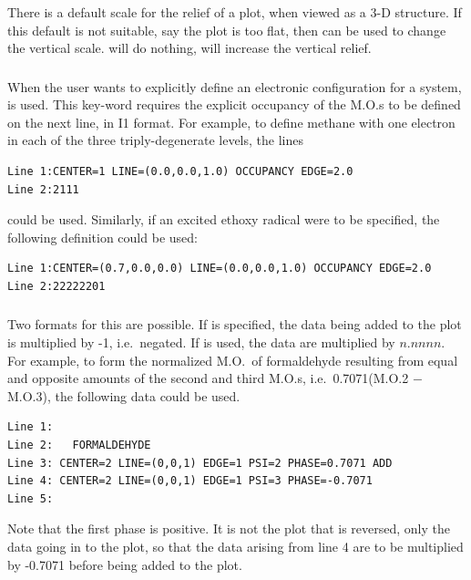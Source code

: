 \subsubsection*{}
There is a default scale for the relief of a plot, when viewed as a 3-D
structure. If this default is not suitable, say the plot is too flat, then
 can be used to change the vertical scale.  
will do nothing,  will increase the vertical relief.

\subsubsection*{}
When the user wants to explicitly define an electronic configuration for a
system,  is used. This key-word requires the explicit occupancy
of the M.O.s to be defined on the next line, in I1 format. For example, to
define methane with one electron in each of the three triply-degenerate levels,
the lines
\begin{verbatim}
Line 1:CENTER=1 LINE=(0.0,0.0,1.0) OCCUPANCY EDGE=2.0
Line 2:2111
\end{verbatim}
could be used. Similarly, if an excited ethoxy radical were to be specified,
the following definition could be used:
\begin{verbatim}
Line 1:CENTER=(0.7,0.0,0.0) LINE=(0.0,0.0,1.0) OCCUPANCY EDGE=2.0
Line 2:22222201
\end{verbatim}

\subsubsection*{}
Two formats for this are possible. If  is specified, the data being
added to the plot is multiplied by -1, i.e.\ negated.  If 
is used, the data are multiplied by $n.nnnn$. For example, to form the
normalized M.O.\ of formaldehyde resulting from equal and opposite amounts of
the second and third M.O.s, i.e.\ 0.7071(M.O.2 $-$ M.O.3), the following  data
could be used.
\begin{verbatim}
Line 1:
Line 2:   FORMALDEHYDE
Line 3: CENTER=2 LINE=(0,0,1) EDGE=1 PSI=2 PHASE=0.7071 ADD
Line 4: CENTER=2 LINE=(0,0,1) EDGE=1 PSI=3 PHASE=-0.7071
Line 5:
\end{verbatim}
Note that the first phase is positive. It is not the plot that is reversed,
only the data going in to the plot, so that the data arising from line 4 are to
be multiplied by -0.7071 before being added to the plot.

